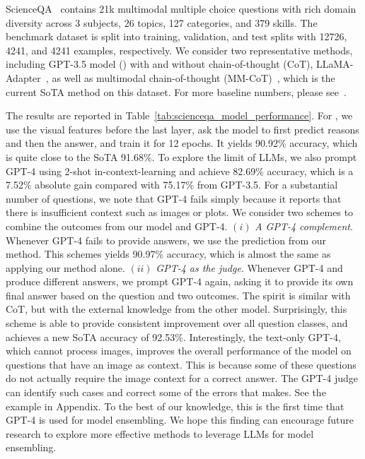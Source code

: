 ScienceQA~\cite{lu2022learn} contains 21k multimodal
multiple choice questions with rich domain diversity across
3 subjects, 26 topics, 127 categories, and 379 skills. The
benchmark dataset is split into training, validation, and test splits with 12726, 4241, and 4241 examples, respectively. We consider two representative methods, including GPT-3.5 model () with and without chain-of-thought (CoT), LLaMA-Adapter~\citep{zhang2023llama}, as well as multimodal chain-of-thought (MM-CoT)~\cite{zhang2023multimodal},  which is the current SoTA method on this dataset. For more baseline numbers, please see~\cite{lu2022learn}.

The results are reported in Table~\ref{tab:scienceqa_model_performance}.
For \shortname{}, we use the visual features before the last layer, ask the model to first predict reasons and then the answer, and train it for 12 epochs. It yields 90.92\% accuracy, which is quite close to the SoTA 91.68\%.
To explore the limit of LLMs, we also prompt GPT-4 using 2-shot in-context-learning and achieve 82.69\% accuracy, which is a 7.52\% absolute gain compared with 75.17\% from GPT-3.5. For a substantial number of questions, we note that GPT-4 fails simply because it reports that there is insufficient context such as images or plots. We consider two schemes to combine the outcomes from our model and GPT-4. 
$(i)$ {\it A GPT-4 complement}. Whenever GPT-4 fails to provide answers, we use the prediction from our method. This schemes yields 90.97\% accuracy, which is almost the same as applying our method alone.
$(ii)$ {\it GPT-4 as the judge}. Whenever GPT-4 and \shortname{}  produce different answers, we prompt GPT-4 again, asking it to provide its own final answer based on the question and two outcomes. The spirit is similar with CoT, but with the external knowledge from the other model. Surprisingly, this scheme is able to provide consistent improvement over all question classes, and achieves a new SoTA accuracy of 92.53\%. Interestingly, the text-only GPT-4, which cannot process images, improves the overall performance of the model on questions that have an image as context. This is because some of these questions do not actually require the image context for a correct answer. The GPT-4 judge can identify such cases and correct some of the errors that \shortname{} makes. See the example in Appendix. To the best of our knowledge, this is the first time that GPT-4 is used for model ensembling. We hope this finding can encourage future research to explore more effective methods to leverage LLMs for model ensembling.

